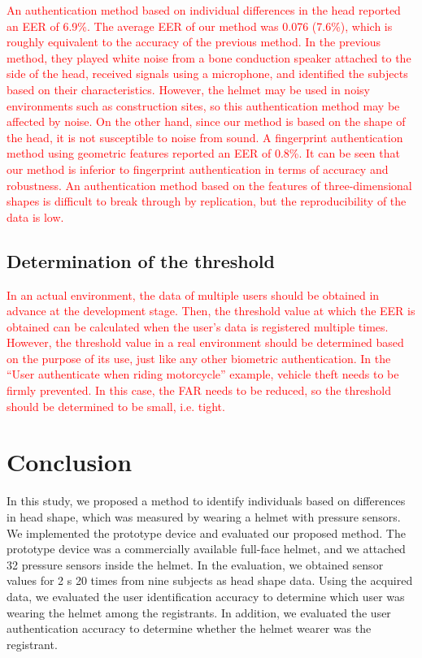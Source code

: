 \documentclass[english,preprint,JIP]{ipsj}
\begin{document}
\textcolor{red}{An authentication method based on individual differences in the head\cite{skull_auth} reported an EER of 6.9\%. The average EER of our method was 0.076 (7.6\%), which is roughly equivalent to the accuracy of the previous method. In the previous method, they played white noise from a bone conduction speaker attached to the side of the head, received signals using a microphone, and identified the subjects based on their characteristics. However, the helmet may be used in noisy environments such as construction sites, so this authentication method may be affected by noise. On the other hand, since our method is based on the shape of the head, it is not susceptible to noise from sound. A fingerprint authentication method using geometric features\cite{finger_geometric} reported an EER of 0.8\%. It can be seen that our method is inferior to fingerprint authentication in terms of accuracy and robustness. An authentication method based on the features of three-dimensional shapes is difficult to break through by replication, but the reproducibility of the data is low.}


\subsection{Determination of the threshold}
\label{sec:determination_of_the_threshold}

\textcolor{red}{In an actual environment, the data of multiple users should be obtained in advance at the development stage. Then, the threshold value at which the EER is obtained can be calculated when the user's data is registered multiple times. However, the threshold value in a real environment should be determined based on the purpose of its use, just like any other biometric authentication. In the ``User authenticate when riding motorcycle'' example, vehicle theft needs to be firmly prevented. In this case, the FAR needs to be reduced, so the threshold should be determined to be small, i.e. tight.}



\section{Conclusion}
\label{sec:conclusion}
In this study, we proposed a method to identify individuals based on differences in head shape, which was measured by wearing a helmet with pressure sensors. We implemented the prototype device and evaluated our proposed method. The prototype device was a commercially available full-face helmet, and we attached 32 pressure sensors inside the helmet. In the evaluation, we obtained sensor values for 2 s 20 times from nine subjects as head shape data. Using the acquired data, we evaluated the user identification accuracy to determine which user was wearing the helmet among the registrants. In addition, we evaluated the user authentication accuracy to determine whether the helmet wearer was the registrant.\par
\end{document}
